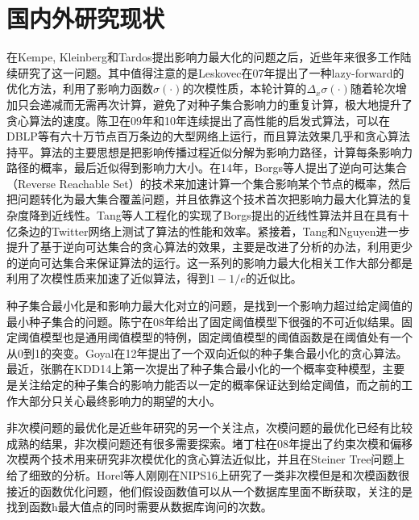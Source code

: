 \section{国内外研究现状}
在Kempe, Kleinberg和Tardos\cite{Kempe2003maximizing}提出影响力最大化的问题之后，近些年来很多工作陆续研究了这一问题\cite{bharathi2007competitive,Leskovec2007celf,Chen2009efficient,chen2010sharpphard,Goyal2011simpath}。其中值得注意的是Leskovec\cite{Leskovec2007celf}在07年提出了一种lazy-forward的优化方法，利用了影响力函数$\sigma(\cdot)$的次模性质，本轮计算的$\Delta_x\sigma(\cdot)$随着轮次增加只会递减而无需再次计算，避免了对种子集合影响力的重复计算，极大地提升了贪心算法的速度。陈卫在09年\cite{Chen2009efficient}和10年\cite{chen2010sharpphard}连续提出了高性能的启发式算法，可以在DBLP等有六十万节点百万条边的大型网络上运行，而且算法效果几乎和贪心算法持平。算法的主要思想是把影响传播过程近似分解为影响力路径，计算每条影响力路径的概率，最后近似得到影响力大小。在14年，Borgs等人\cite{borgs2014rrset}提出了逆向可达集合（Reverse Reachable Set）的技术来加速计算一个集合影响某个节点的概率，然后把问题转化为最大集合覆盖问题，并且依靠这个技术首次把影响力最大化算法的复杂度降到近线性。Tang等人\cite{tang2014newrrset}工程化的实现了Borgs提出的近线性算法并且在具有十亿条边的Twitter网络上测试了算法的性能和效率。紧接着，Tang\cite{tang2015influence}和Nguyen\cite{mtai2016sigmod}进一步提升了基于逆向可达集合的贪心算法的效果，主要是改进了分析的办法，利用更少的逆向可达集合来保证算法的运行。这一系列的影响力最大化相关工作大部分都是利用了次模性质来加速了近似算法，得到$1-1/e$的近似比。

种子集合最小化是和影响力最大化对立的问题，是找到一个影响力超过给定阈值的最小种子集合的问题。陈宁在08年\cite{Chen2008approximability}给出了固定阈值模型下很强的不可近似结果。固定阈值模型也是通用阈值模型的特例，固定阈值模型的阈值函数是在阈值处有一个从0到1的突变。Goyal在12年\cite{goyal2012minimizing}提出了一个双向近似的种子集合最小化的贪心算法。最近，张鹏\cite{zhang2014prob}在KDD14上第一次提出了种子集合最小化的一个概率变种模型，主要是关注给定的种子集合的影响力能否以一定的概率保证达到给定阈值，而之前的工作大部分只关心最终影响力的期望的大小。


非次模问题的最优化是近些年研究的另一个关注点，次模问题的最优化已经有比较成熟的结果，非次模问题还有很多需要探索。堵丁柱\cite{du2008analysis}在08年提出了约束次模和偏移次模两个技术用来研究非次模优化的贪心算法近似比，并且在Steiner Tree问题上给了细致的分析。Horel等人\cite{Horel2016sub}刚刚在NIPS16上研究了一类非次模但是和次模函数很接近的函数优化问题，他们假设函数值可以从一个数据库里面不断获取，关注的是找到函数h最大值点的同时需要从数据库询问的次数。

